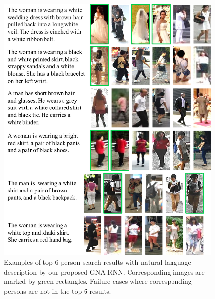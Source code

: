\begin{figure}[t]
	\begin{center}
		\includegraphics[width=0.9\linewidth]{figures/person_nlp/retrievalfail.pdf}
		\vspace{-7pt}
	\end{center}
	\caption{Examples of top-6 person search results with natural language description by our proposed GNA-RNN. Corresponding images are marked by green rectangles. Failure cases where corresponding persons are not in the top-6 results.}
	\label{fig:finalexamplesfail}
	\vspace{-7pt}
\end{figure}


